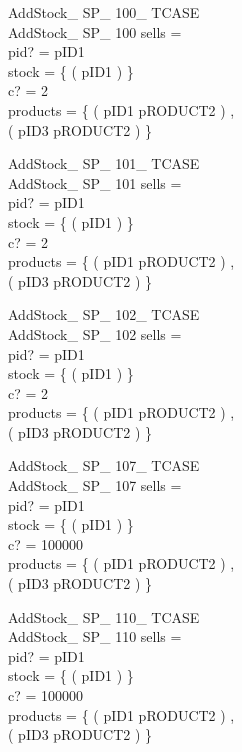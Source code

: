 \documentclass[fleqn,colorlinks,linkcolor=blue,citecolor=blue,urlcolor=blue]{article}
\newcommand{\negate}[0]{-}
\begin{document}
\begin{multicols}{2}
\begin{schema}{AddStock\_ SP\_ 100\_ TCASE}\\
 AddStock\_ SP\_ 100
\where
 sells =~\emptyset \\
 pid? = pID1 \\
 stock = \{ ( pID1  ) \} \\
 c? = 2 \\
 products = \{ ( pID1 \mapsto pRODUCT2 ) , \\ ( pID3 \mapsto pRODUCT2 ) \}
\end{schema}


\begin{schema}{AddStock\_ SP\_ 101\_ TCASE}\\
 AddStock\_ SP\_ 101
\where
 sells =~\emptyset \\
 pid? = pID1 \\
 stock = \{ ( pID1  ) \} \\
 c? = 2 \\
 products = \{ ( pID1 \mapsto pRODUCT2 ) , \\ ( pID3 \mapsto pRODUCT2 ) \}
\end{schema}


\begin{schema}{AddStock\_ SP\_ 102\_ TCASE}\\
 AddStock\_ SP\_ 102
\where
 sells =~\emptyset \\
 pid? = pID1 \\
 stock = \{ ( pID1  ) \} \\
 c? = 2 \\
 products = \{ ( pID1 \mapsto pRODUCT2 ) , \\ ( pID3 \mapsto pRODUCT2 ) \}
\end{schema}


\begin{schema}{AddStock\_ SP\_ 107\_ TCASE}\\
 AddStock\_ SP\_ 107
\where
 sells =~\emptyset \\
 pid? = pID1 \\
 stock = \{ ( pID1 \mapsto \negate 4294967296 ) \} \\
 c? = 100000 \\
 products = \{ ( pID1 \mapsto pRODUCT2 ) , \\ ( pID3 \mapsto pRODUCT2 ) \}
\end{schema}


\begin{schema}{AddStock\_ SP\_ 110\_ TCASE}\\
 AddStock\_ SP\_ 110
\where
 sells =~\emptyset \\
 pid? = pID1 \\
 stock = \{ ( pID1  ) \} \\
 c? = 100000 \\
 products = \{ ( pID1 \mapsto pRODUCT2 ) , \\ ( pID3 \mapsto pRODUCT2 ) \}
\end{schema}



\end{multicols}
\end{document}
